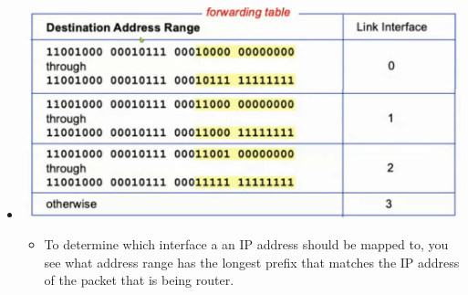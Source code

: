 \documentclass{article}
\begin{document}
\begin{itemize}
        \item[] \includegraphics[width=\textwidth - 25pt]{images/Forward-Table.png}
        \begin{itemize}
            \item To determine which interface a an IP address should be mapped to, you see what address range has the longest prefix that matches the IP address of the packet that is being router.
        \end{itemize} 
    \end{itemize}
\end{document}
